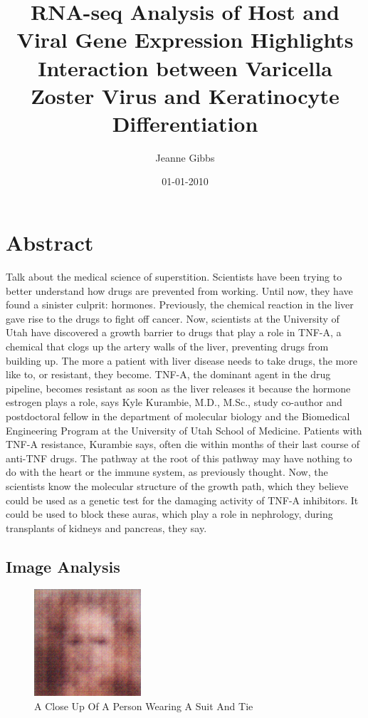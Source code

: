 \documentclass{article}%
\title{RNA{-}seq Analysis of Host and Viral Gene Expression Highlights Interaction between Varicella Zoster Virus and Keratinocyte Differentiation}%
\author{Jeanne Gibbs}%
\affil{Blood Transfusion Centre of Slovenia, Ljubljana, Slovenia}%
\date{01{-}01{-}2010}%
\begin{document}
%
\normalsize%
\maketitle%
\section{Abstract}%
\label{sec:Abstract}%
Talk about the medical science of superstition. Scientists have been trying to better understand how drugs are prevented from working. Until now, they have found a sinister culprit: hormones.\newline%
Previously, the chemical reaction in the liver gave rise to the drugs to fight off cancer. Now, scientists at the University of Utah have discovered a growth barrier to drugs that play a role in TNF{-}A, a chemical that clogs up the artery walls of the liver, preventing drugs from building up. The more a patient with liver disease needs to take drugs, the more like to, or resistant, they become.\newline%
TNF{-}A, the dominant agent in the drug pipeline, becomes resistant as soon as the liver releases it because the hormone estrogen plays a role, says Kyle Kurambie, M.D., M.Sc., study co{-}author and postdoctoral fellow in the department of molecular biology and the Biomedical Engineering Program at the University of Utah School of Medicine.\newline%
Patients with TNF{-}A resistance, Kurambie says, often die within months of their last course of anti{-}TNF drugs.\newline%
The pathway at the root of this pathway may have nothing to do with the heart or the immune system, as previously thought.\newline%
Now, the scientists know the molecular structure of the growth path, which they believe could be used as a genetic test for the damaging activity of TNF{-}A inhibitors. It could be used to block these auras, which play a role in nephrology, during transplants of kidneys and pancreas, they say.

%
\subsection{Image Analysis}%
\label{subsec:ImageAnalysis}%


\begin{figure}[h!]%
\centering%
\includegraphics[width=150px]{500_fake_images/samples_5_248.png}%
\caption{A Close Up Of A Person Wearing A Suit And Tie}%
\end{figure}

%
\end{document}
